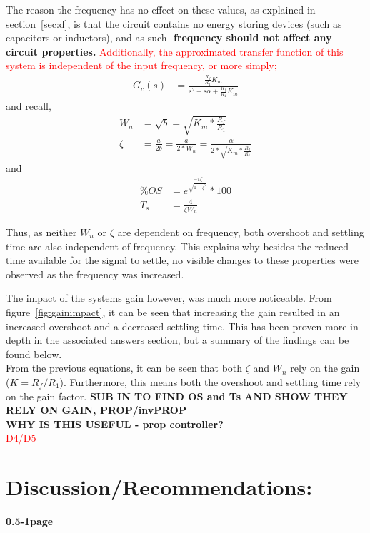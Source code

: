\documentclass[11pt,a4paper]{article}
\begin{document}
The reason the frequency has no effect on these values, as explained in section~\ref{sec:d}, is that the circuit contains no energy storing devices (such as capacitors or inductors), and as such- \textbf{frequency should not affect any circuit properties.} \textcolor{red}{Additionally, the approximated transfer function of this system is independent of the input frequency, or more simply;}
\begin{align*}
G_c(s) &= \frac{\frac{R_f}{R_1}K_m} {s^2 + s\alpha + \frac{R_f}{R_1}K_m}
\end{align*}
and recall, 
\begin{align*}
W_n &= \sqrt{b} = \sqrt{K_m * \frac{R_f}{R_1}} \\
\zeta &= \frac{a}{2b} = \frac{a}{2*W_n} = \frac{\alpha}{2*\sqrt{K_m * \frac{R_f}{R_1}}}
\end{align*}
and
\begin{align*}
\%OS &= e^{\frac{-\pi \zeta}{\sqrt{1-\zeta^2}}} * 100 \\
T_s &= \frac{4}{\zeta W_n}
\end{align*}

Thus, as neither $W_n$ or $\zeta$ are dependent on frequency, both overshoot and settling time are also independent of frequency. 
This explains why besides the reduced time available for the signal to settle, no visible changes to these properties were observed as the frequency was increased. 

The impact of the systems gain however, was much more noticeable. From figure~\ref{fig:gainimpact}, it can be seen that increasing the gain resulted in an increased overshoot and a decreased settling time. This has been proven more in depth in the associated answers section, but a summary of the findings can be found below.  \\
From the previous equations, it can be seen that both $\zeta$ and $W_n$ rely on the gain ($K = R_f/R_1$). Furthermore, this means both the overshoot and settling time rely on the gain factor.
\textbf{SUB IN TO FIND OS and Ts AND SHOW THEY RELY ON GAIN, PROP/invPROP}\\
\textbf{WHY IS THIS USEFUL - prop controller?}\\
\textcolor{red}{D4/D5}



\pagebreak
\section{Discussion/Recommendations:}
\textbf{0.5-1page}\\
\end{document}
